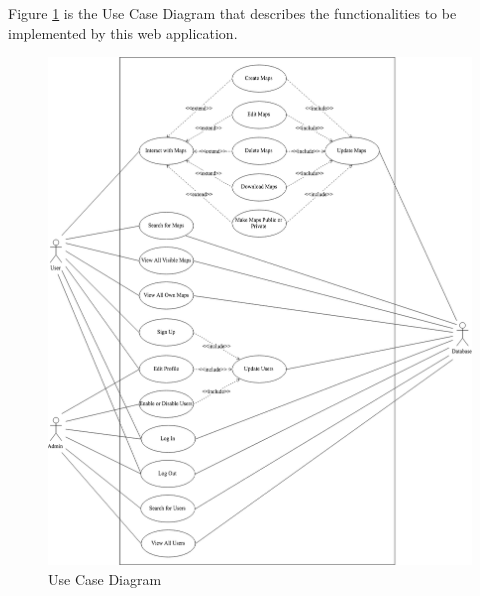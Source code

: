 Figure \ref{fig:Use Case Diagram} is the Use Case Diagram that describes the functionalities to be implemented by this web application.

\begin{figure}[!htbp]
\centering
\includegraphics[width=\textwidth]{section02/assets/use_case.png}
\caption[Use Case Diagram]{\label{fig:Use Case Diagram}Use Case Diagram}
\end{figure}

